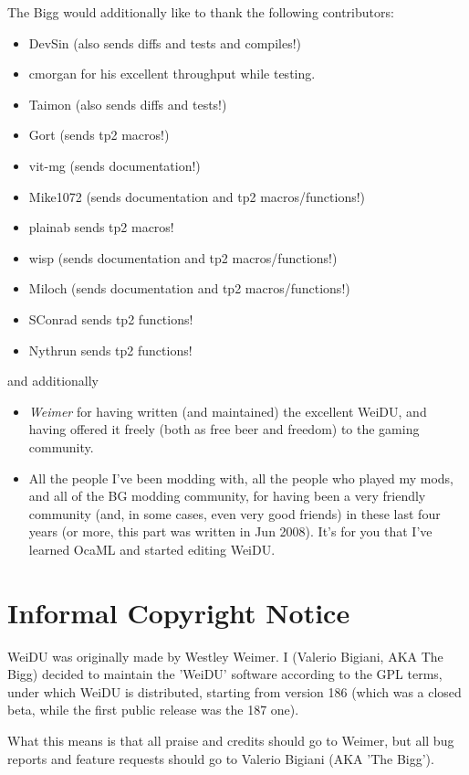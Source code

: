 \documentclass{article}
\begin{document}
The Bigg would additionally like to thank the following contributors:
\begin{itemize}
\item DevSin (also sends diffs and tests and compiles!)
\item cmorgan for his excellent throughput while testing.
\item Taimon (also sends diffs and tests!)
\item Gort (sends tp2 macros!)
\item vit-mg (sends documentation!)
\item Mike1072 (sends documentation and tp2 macros/functions!)
\item plainab {sends tp2 macros!}
\item wisp (sends documentation and tp2 macros/functions!)
\item Miloch (sends documentation and tp2 macros/functions!)
\item SConrad {sends tp2 functions!}
\item Nythrun {sends tp2 functions!}
\end{itemize}
and additionally
\begin{itemize}
\item {\em Weimer} for having written (and maintained) the excellent WeiDU,
and having offered it freely (both as free beer and freedom) to the gaming
community.
\item All the people I've been modding with, all the people who played my mods,
and all of the BG modding community, for having been a very friendly community
(and, in some cases, even very good friends) in these last four years (or more,
this part was written in Jun 2008). It's for you that I've learned OcaML and
started editing WeiDU.
\end{itemize}

\section{Informal Copyright Notice}
WeiDU was originally made by Westley Weimer.
I (Valerio Bigiani, AKA The Bigg) decided to maintain the 'WeiDU' software
according to the GPL terms, under which WeiDU is distributed, starting from
version 186 (which was a closed beta, while the first public release was the
187 one).

What this means is that all praise and credits should go to Weimer, but all
bug reports and feature requests should go to Valerio Bigiani (AKA 'The Bigg').
\end{document}
